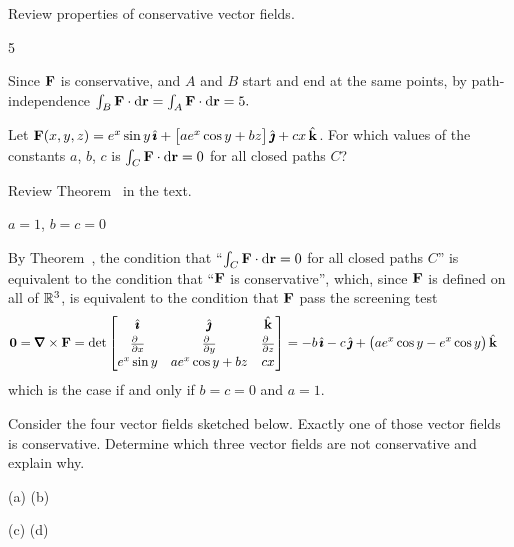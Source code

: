 \begin{hint}
Review properties of conservative vector fields.
\end{hint}
\begin{answer}
5
\end{answer}
\begin{solution}
Since $\mathbf{F}$ is conservative, and $A$ and $B$ start and end at the same points, by path-independence 
$\int_B \mathbf{F}\cdot\mathrm{d}\mathbf{r}=\int_A \mathbf{F}\cdot\mathrm{d}\mathbf{r}=5.$
\end{solution}

\begin{question}[M317 2016D] %
Let $\mathbf{F}(x, y, z) = e^x \sin y\,\hat{\pmb{\imath}} + \big[ ae^x \cos y + bz\big]\,\hat{\pmb{\jmath}} 
   + cx\, \hat{\mathbf{k}}$. For which values of the constants $a$, $b$, $c$
is $\int_C\mathbf{F}\cdot\mathrm{d}\mathbf{r}=0$ for all closed paths $C$?
\end{question}

\begin{hint} 
Review Theorem~ in the text.
\end{hint}

\begin{answer} 
$a=1$, $b=c=0$
\end{answer}

\begin{solution} 
By Theorem~, the condition that 
 ``$\int_C\mathbf{F}\cdot\mathrm{d}\mathbf{r}=0$ for all closed paths $C$''
is equivalent to the condition that ``$\mathbf{F}$ is conservative'', which, 
since $\mathbf{F}$ is defined on all of $\mathbb{R}^3$, is equivalent to the condition 
that $\mathbf{F}$ pass the screening test
\begin{align*}
\vZero =\vnabla\times \vF
&=\det\left[\begin{matrix}\hi&\hj&\hk\\[0.03in] 
     \frac{\partial\hfill}{\partial x}&
        \frac{\partial\hfill}{\partial y}&
        \frac{\partial\hfill}{\partial z}\\[0.03in]
e^x \sin y & ae^x \cos y + bz & cx\end{matrix}\right]
= -b\,\hi-c\,\hj+\big(ae^x\cos y-e^x\cos y\big)\,\hk
\end{align*}
which is the case if and only if $b=c=0$ and $a=1$.
\end{solution}


\begin{question}
Consider the four vector fields sketched below. Exactly one of
those vector fields is conservative. Determine which three vector fields 
are not conservative and explain why.
\begin{center}
      (a) \qquad
      (b) \qquad
\end{center}
\begin{center}
      (c) \qquad
      (d) \qquad
\end{center}
\end{question}


